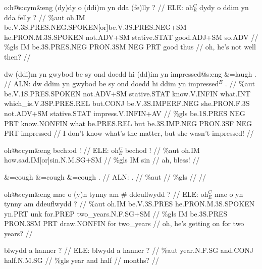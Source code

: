\documentclass[a4paper,10pt]{article}
\begin{document}
\ex
\begingl[lingstyle=gergl]
\glchat o:h@s:cym\&eng (dy)dy o (ddi)m yn dda (fe)lly ? //
\glsurface ELE:  oh$^{C}_{E}$ dydy o ddim yn dda felly ?  //
\glauto \%aut  oh{\scriptsize .IM} be{\scriptsize .V.3S.PRES.NEG.SPOKEN[or]be.V.3S.PRES.NEG+SM} he{\scriptsize .PRON.M.3S.SPOKEN} not{\scriptsize .ADV+SM} stative{\scriptsize .STAT} good{\scriptsize .ADJ+SM} so{\scriptsize .ADV}   //
\glmanual \%gls  IM be{\scriptsize .3S.PRES.NEG} PRON{\scriptsize .3SM} NEG PRT good thus   //
\gleng oh, he's not well then? //
\endgl
\xe

\ex
\begingl[lingstyle=gergl]
\glchat dw (ddi)m yn gwybod be sy ond doedd hi (dd)im yn impressed@s:eng \&=laugh . //
\glsurface ALN:  dw ddim yn gwybod be sy ond doedd hi ddim yn impressed$^{E}$ .  //
\glauto \%aut  be{\scriptsize .V.1S.PRES.SPOKEN} not{\scriptsize .ADV+SM} stative{\scriptsize .STAT} know{\scriptsize .V.INFIN} what{\scriptsize .INT} which\_is{\scriptsize .V.3SP.PRES.REL} but{\scriptsize .CONJ} be{\scriptsize .V.3S.IMPERF.NEG} she{\scriptsize .PRON.F.3S} not{\scriptsize .ADV+SM} stative{\scriptsize .STAT} impress{\scriptsize .V.INFIN+AV}   //
\glmanual \%gls  be{\scriptsize .1S.PRES} NEG PRT know{\scriptsize .NONFIN} what be{\scriptsize .PRES.REL} but be{\scriptsize .3S.IMP.NEG} PRON{\scriptsize .3SF} NEG PRT impressed   //
\gleng I don't know what's the matter, but she wasn't impressed! //
\endgl
\xe

\ex
\begingl[lingstyle=gergl]
\glchat oh@s:cym\&eng bech:od ! //
\glsurface ELE:  oh$^{C}_{E}$ bechod !  //
\glauto \%aut  oh{\scriptsize .IM} how{\scriptsize .sad.IM[or]sin.N.M.SG+SM}   //
\glmanual \%gls  IM sin   //
\gleng ah, bless! //
\endgl
\xe

\ex
\begingl[lingstyle=gergl]
\glchat \&=cough \&=cough \&=cough . //
\glsurface ALN:  .  //
\glauto \%aut    //
\glmanual \%gls    //
\gleng  //
\endgl
\xe

\ex
\begingl[lingstyle=gergl]
\glchat oh@s:cym\&eng mae o (y)n tynny am \# ddeuflwydd ? //
\glsurface ELE:  oh$^{C}_{E}$ mae o yn tynny am ddeuflwydd ?  //
\glauto \%aut  oh{\scriptsize .IM} be{\scriptsize .V.3S.PRES} he{\scriptsize .PRON.M.3S.SPOKEN} yn{\scriptsize .PRT} unk for{\scriptsize .PREP} two\_years{\scriptsize .N.F.SG+SM}   //
\glmanual \%gls  IM be{\scriptsize .3S.PRES} PRON{\scriptsize .3SM} PRT draw{\scriptsize .NONFIN} for two\_years   //
\gleng oh, he's getting on for two years? //
\endgl
\xe

\ex
\begingl[lingstyle=gergl]
\glchat blwydd a hanner ? //
\glsurface ELE:  blwydd a hanner ?  //
\glauto \%aut  year{\scriptsize .N.F.SG} and{\scriptsize .CONJ} half{\scriptsize .N.M.SG}   //
\glmanual \%gls  year and half   //
 months? //
\endgl
\xe
\end{document}
